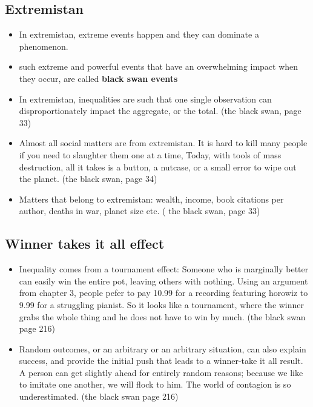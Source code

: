 \documentclass[11pt]{article}
\begin{document}
\subsection{Extremistan}
\begin{itemize}
 \item In extremistan, extreme events happen and they can dominate a phenomenon.
 \item such extreme and powerful events that have an overwhelming impact when they occur, are called \textbf{black swan events}
 \item In extremistan, inequalities are such that one single observation can disproportionately impact the aggregate, or the total. (the black swan, page 33)
 \item Almost all social matters are from extremistan. It is hard to kill many people if you need to slaughter them one at a time, Today, with tools of mass destruction, all it takes is a button, a nutcase, or a small error to wipe out the planet. (the black swan, page 34)
 \item Matters that belong to extremistan: wealth, income, book citations per author, deaths in war, planet size etc. ( the black swan, page 33)
\end{itemize}
\subsection{Winner takes it all effect}
\begin{itemize}
 \item   Inequality comes from a tournament effect: Someone who is marginally better can easily win the entire pot, leaving others with nothing. Using an argument from chapter 3, people pefer to pay 10.99 for a recording featuring horowiz to 9.99 for a struggling pianist. So it looks like a tournament, where the winner grabs the whole thing and he does not have to win by much. (the black swan page 216)
 \item Random outcomes, or an arbitrary or an arbitrary situation, can also explain success, and provide the initial push that leads to a winner-take it all result. A person can get slightly ahead for entirely random reasons; because we like to imitate one another, we will flock to him. The world of contagion is so underestimated. (the black swan page 216)
\end{itemize}
\end{document}
